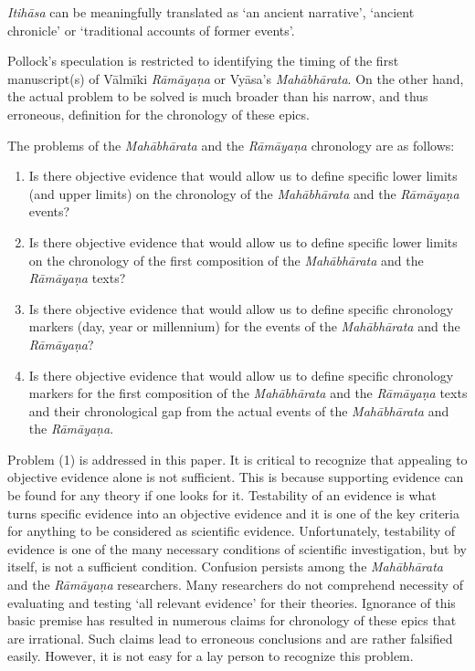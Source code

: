 \newpage

\textit{Itihāsa} can be meaningfully translated as ‘an ancient narrative’, ‘ancient chronicle’ or ‘traditional accounts of former events’.

Pollock’s speculation is restricted to identifying the timing of the first manuscript(s) of Vālmīki \textit{Rāmāyaṇa} or Vyāsa’s \textit{Mahābhārata}. On the other hand, the actual problem to be solved is much broader than his narrow, and thus erroneous, definition for the chronology of these epics.

The problems of the \textit{Mahābhārata} and the \textit{Rāmāyaṇa} chronology are as follows:

\begin{enumerate}
\itemsep=0pt
\item Is there objective evidence that would allow us to define specific lower limits (and upper limits) on the chronology of the \textit{Mahābhārata} and the \textit{Rāmāyaṇa} events?

 \item Is there objective evidence that would allow us to define specific lower limits on the chronology of the first composition of the \textit{Mahābhārata} and the \textit{Rāmāyaṇa} texts?

 \item Is there objective evidence that would allow us to define specific chronology markers (day, year or millennium) for the events of the \textit{Mahābhārata} and the \textit{Rāmāyaṇa}?

 \item Is there objective evidence that would allow us to define specific chronology markers for the first composition of the \textit{Mahābhārata} and the \textit{Rāmāyaṇa} texts and their chronological gap from the actual events of the \textit{Mahābhārata} and the \textit{Rāmāyaṇa}.

\end{enumerate}

Problem (1) is addressed in this paper. It is critical to recognize that appealing to objective evidence alone is not sufficient. This is because supporting evidence can be found for any theory if one looks for it. Testability of an evidence is what turns specific evidence into an objective evidence and it is one of the key criteria for anything to be considered as scientific evidence. Unfortunately, testability of evidence is one of the many necessary conditions of scientific investigation, but by itself, is not a sufficient condition. Confusion persists among the \textit{Mahābhārata} and the \textit{Rāmāyaṇa} researchers. Many researchers do not comprehend necessity of evaluating and testing ‘all relevant evidence’ for their theories. Ignorance of this basic premise has resulted in numerous claims for chronology of these epics that are irrational. Such claims lead to erroneous conclusions and are rather falsified easily. However, it is not easy for a lay person to recognize this problem.

